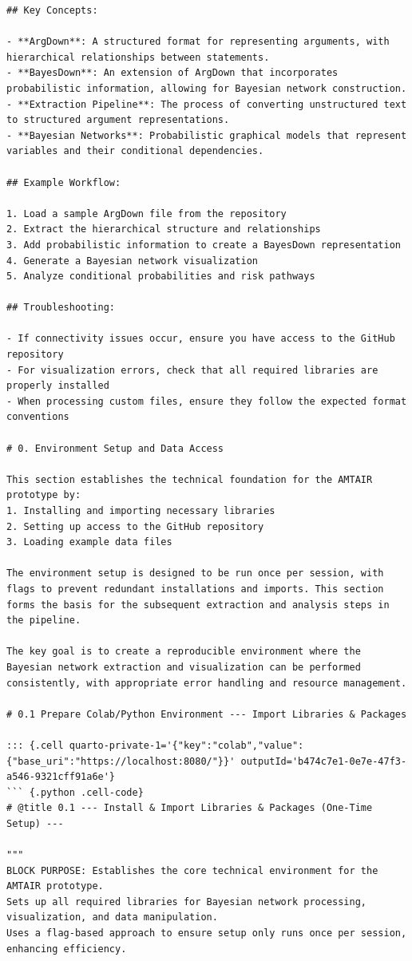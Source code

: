 \documentclass[
  11pt,
  letterpaper,
]{book}
\begin{document}
\begin{verbatim}
## Key Concepts:

- **ArgDown**: A structured format for representing arguments, with hierarchical relationships between statements.
- **BayesDown**: An extension of ArgDown that incorporates probabilistic information, allowing for Bayesian network construction.
- **Extraction Pipeline**: The process of converting unstructured text to structured argument representations.
- **Bayesian Networks**: Probabilistic graphical models that represent variables and their conditional dependencies.

## Example Workflow:

1. Load a sample ArgDown file from the repository
2. Extract the hierarchical structure and relationships
3. Add probabilistic information to create a BayesDown representation
4. Generate a Bayesian network visualization
5. Analyze conditional probabilities and risk pathways

## Troubleshooting:

- If connectivity issues occur, ensure you have access to the GitHub repository
- For visualization errors, check that all required libraries are properly installed
- When processing custom files, ensure they follow the expected format conventions

# 0. Environment Setup and Data Access

This section establishes the technical foundation for the AMTAIR prototype by:
1. Installing and importing necessary libraries
2. Setting up access to the GitHub repository
3. Loading example data files

The environment setup is designed to be run once per session, with flags to prevent redundant installations and imports. This section forms the basis for the subsequent extraction and analysis steps in the pipeline.

The key goal is to create a reproducible environment where the Bayesian network extraction and visualization can be performed consistently, with appropriate error handling and resource management.

# 0.1 Prepare Colab/Python Environment --- Import Libraries & Packages

::: {.cell quarto-private-1='{"key":"colab","value":{"base_uri":"https://localhost:8080/"}}' outputId='b474c7e1-0e7e-47f3-a546-9321cff91a6e'}
``` {.python .cell-code}
# @title 0.1 --- Install & Import Libraries & Packages (One-Time Setup) ---

"""
BLOCK PURPOSE: Establishes the core technical environment for the AMTAIR prototype.
Sets up all required libraries for Bayesian network processing, visualization, and data manipulation.
Uses a flag-based approach to ensure setup only runs once per session, enhancing efficiency.


\end{verbatim}
\end{document}
